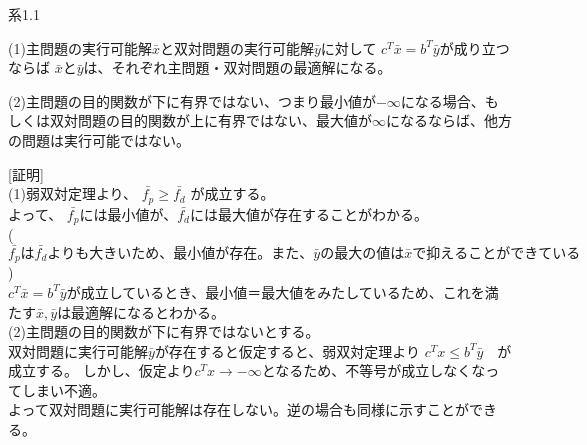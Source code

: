 \documentclass[platex,dvipdfmx]{jlreq}			%
\begin{document}
\begin{itembox}[l]{系1.1}

(1)主問題の実行可能解$\bar{x}$と双対問題の実行可能解$\bar{y}$に対して
$c^T \bar{x} = b^T \bar{y}$が成り立つならば
$\bar{x}$と$\bar{y}$は、それぞれ主問題・双対問題の最適解になる。

(2)主問題の目的関数が下に有界ではない、つまり最小値が$- \infty $になる場合、もしくは双対問題の目的関数が上に有界ではない、最大値が$\infty$になるならば、他方の問題は実行可能ではない。
\end{itembox}
[証明]\\
(1)弱双対定理より、
$
\bar{f_p}  \geq   \bar{f_d}
$
が成立する。\\
よって、 $\bar{f_p}$には最小値が、$\bar{f_d}$には最大値が存在することがわかる。\\
($\bar{f_p}は \bar{f_d}よりも大きいため、最小値が存在。 また、\bar{y}の最大の値は\bar{x}で抑えることができている$)\\
$c^T \bar{x} = b^T \bar{y}$が成立しているとき、最小値＝最大値をみたしているため、これを満たす$\bar{x} , \bar{y}$は最適解になるとわかる。
\\
(2)主問題の目的関数が下に有界ではないとする。\\
双対問題に実行可能解$\bar{y}$が存在すると仮定すると、弱双対定理より
$c^T x  \leq b^T \bar{y}$　が成立する。
しかし、仮定より$c^T x → -\infty$となるため、不等号が成立しなくなってしまい不適。\\
よって双対問題に実行可能解は存在しない。逆の場合も同様に示すことができる。
\end{document}
